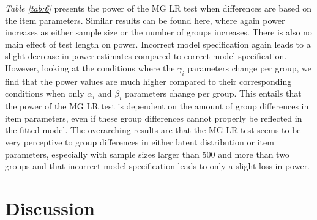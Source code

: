 \documentclass[Royal,sageapa,times,doublespace]{sagej}
\begin{document}
\indent \textit{Table \ref{tab:6}} presents the power of the MG LR test when differences are based on the item parameters. Similar results can be found here, where again power increases as either sample size or the number of groups increases. There is also no main effect of test length on power. Incorrect model specification again leads to a slight decrease in power estimates compared to correct model specification. However, looking at the conditions where the $\gamma_i$ parameters change per group, we find that the power values are much higher compared to their corresponding conditions when only $\alpha_i$ and $\beta_i$ parameters change per group. This entails that the power of the MG LR test is dependent on the amount of group differences in item parameters, even if these group differences cannot properly be reflected in the fitted model. The overarching results are that the MG LR test seems to be very perceptive to group differences in either latent distribution or item parameters, especially with sample sizes larger than 500 and more than two groups and that incorrect model specification leads to only a slight loss in power. \\


\section{Discussion}
\end{document}
